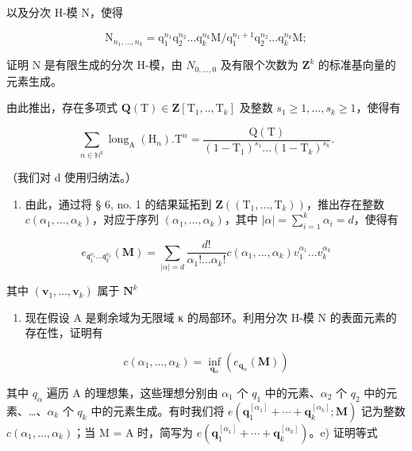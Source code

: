 以及分次 H-模 N，使得

\[
 \mathrm{N} _ {n _ {1}, \dots , n _ {k}} = \mathrm{q} _ {1} ^ {n _ {1}} \mathrm{q} _ {2} ^ {n _ {2}} \dots \mathrm{q} _ {k} ^ {n _ {k}} \mathrm{M} / \mathrm{q} _ {1} ^ {n _ {1} + 1} \mathrm{q} _ {2} ^ {n _ {2}} \dots \mathrm{q} _ {k} ^ {n _ {k}} \mathrm{M};
\]

证明 N 是有限生成的分次 H-模，由 \(N_{0,\ldots,0}\) 及有限个次数为 \(\mathbf{Z}^{k}\) 的标准基向量的元素生成。

由此推出，存在多项式 \(\mathbf{Q}(\mathrm{T}) \in \mathbf{Z}[\mathrm{T}_1,..,\mathrm{T}_k]\) 及整数 \(s_1 \geqslant 1, ..., s_k \geqslant 1\)，使得有

\[
\sum_ {n \in \mathbb {N} ^ {k}} \operatorname{long} _ {\mathrm{A}} (\mathrm{H} _ {n}). \mathrm{T} ^ {n} = \frac {\mathrm{Q} (\mathrm{T})}{(1 - \mathrm{T} _ {1}) ^ {s _ {1}} \dots (1 - \mathrm{T} _ {k}) ^ {s _ {k}}}.
\]

（我们对 d 使用归纳法。）

\begin{enumerate}
\def\labelenumi{\alph{enumi})}
\setcounter{enumi}{2}
\tightlist
\item
  由此，通过将 § 6, no. 1 的结果延拓到 \(\mathbf{Z}((\mathrm{T}_{1},\ldots,\mathrm{T}_{k}))\)，推出存在整数 \(c(\alpha_{1},\ldots,\alpha_{k})\)，对应于序列 \((\alpha_{1},\ldots,\alpha_{k})\)，其中 \(|\alpha| = \sum_{i=1}^{k}\alpha_{i} = d\)，使得有
\end{enumerate}

\[
e _ {\mathfrak {q} _ {1} ^ {\nu_ {1}} \dots \mathfrak {q} _ {k} ^ {\nu_ {k}}} (\mathbf {M}) = \sum_ {| \alpha | = d} \frac {d !}{\alpha_ {1} ! \dots \alpha_ {k} !} c (\alpha_ {1},..., \alpha_ {k}) v _ {1} ^ {\alpha_ {1}}... v _ {k} ^ {\alpha_ {k}}
\]

其中 \((\mathbf{v}_1,\dots,\mathbf{v}_k)\) 属于 \(\mathbf{N}^k\)

\begin{enumerate}
\def\labelenumi{\alph{enumi})}
\setcounter{enumi}{3}
\tightlist
\item
  现在假设 A 是剩余域为无限域 κ 的局部环。利用分次 H-模 N 的表面元素的存在性，证明有
\end{enumerate}

\[
c (\alpha_ {1}, \dots , \alpha_ {k}) = \inf _ {\mathbf {q} _ {\alpha}} (e _ {\mathbf {q} _ {\alpha}} (\mathbf {M}))
\]

  其中 \(q_{\alpha}\) 遍历 A 的理想集，这些理想分别由 \(\alpha_{1}\) 个 \(q_{1}\) 中的元素、\(\alpha_{2}\) 个 \(q_{2}\) 中的元素、\ldots、\(\alpha_{k}\) 个 \(q_{k}\) 中的元素生成。有时我们将 \(e(\mathbf{q}_{1}^{[\alpha_{1}]} + \cdots + \mathbf{q}_{k}^{[\alpha_{k}]}; \mathbf{M})\) 记为整数 \(c(\alpha_{1}, \ldots, \alpha_{k})\)；当 M = A 时，简写为 \(e(\mathbf{q}_{1}^{[\alpha_{1}]} + \cdots + \mathbf{q}_{k}^{[\alpha_{k}]})\)。e) 证明等式

